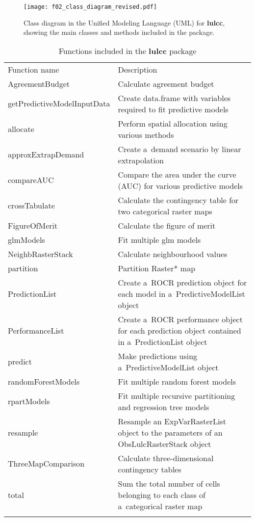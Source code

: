 \documentclass[gmdd, online, hvmath]{copernicus}
\begin{document}
\begin{figure}[t]
  \texttt{[image: f02\_class\_diagram\_revised.pdf]}
  \caption{Class diagram in the Unified Modeling Language (UML) for \textbf{lulcc}, showing the main classes and methods included in the package.}
  \label{fig:classdiagram}
\end{figure}

\begin{table*}[t]
\caption{Functions included in the \textbf{lulcc} package}
\begin{tabular}{ p{3.5cm} p{8.5cm} }
\tophline
Function name & Description \\
\middlehline
AgreementBudget    & Calculate agreement budget \citep{pontius2011} \\
getPredictiveModelInputData & Create data.frame with variables required to fit predictive models \\
allocate           & Perform spatial allocation using various methods \\
approxExtrapDemand & Create a~demand scenario by linear extrapolation \\
compareAUC         & Compare the area under the curve (AUC) for various predictive models \\
crossTabulate      & Calculate the contingency table for two categorical raster maps \\
FigureOfMerit      & Calculate the figure of merit \citep{pontius2011} \\
glmModels          & Fit multiple glm models \\
NeighbRasterStack  & Calculate neighbourhood values \\
partition          & Partition Raster* map \\
PredictionList     & Create a~ROCR prediction object for each model in a~PredictiveModelList object \\
PerformanceList    & Create a~ROCR performance object for each prediction object contained in a~PredictionList object \\
predict            & Make predictions using a~PredictiveModelList object \\
randomForestModels & Fit multiple random forest models \\
rpartModels        & Fit multiple recursive partitioning and regression tree models \\
resample           & Resample an ExpVarRasterList object to the parameters of an ObsLulcRasterStack object \\
ThreeMapComparison & Calculate three-dimensional contingency tables \citep{pontius2011} \\
total              & Sum the total number of cells belonging to each class of a~categorical raster map \\
\bottomhline
\end{tabular}
\label{table:functions}
\belowtable{}
\end{table*}
\end{document}
